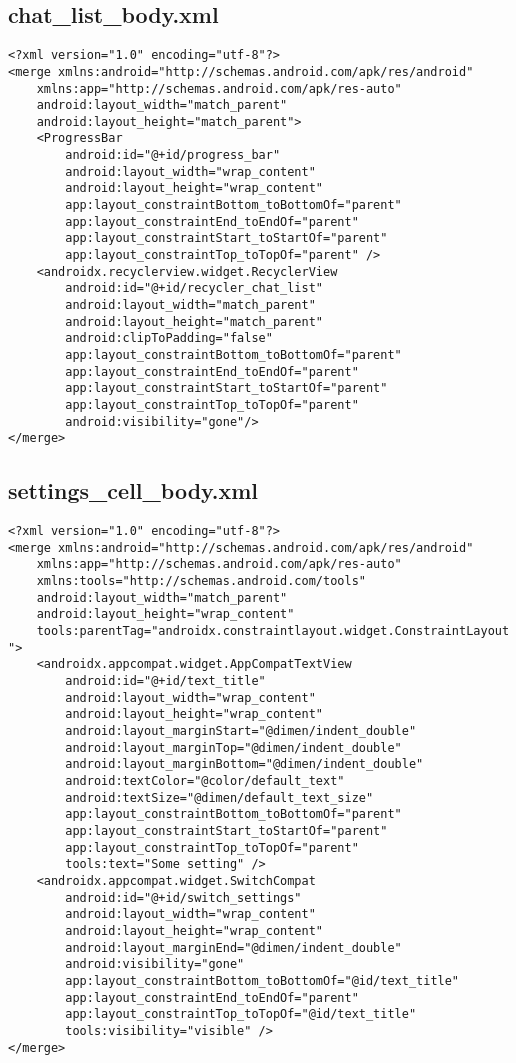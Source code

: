 \documentclass[listing]{espd}
\begin{document}
\subsection{chat\_list\_body.xml}
\begin{verbatim}
<?xml version="1.0" encoding="utf-8"?>
<merge xmlns:android="http://schemas.android.com/apk/res/android"
    xmlns:app="http://schemas.android.com/apk/res-auto"
    android:layout_width="match_parent"
    android:layout_height="match_parent">
    <ProgressBar
        android:id="@+id/progress_bar"
        android:layout_width="wrap_content"
        android:layout_height="wrap_content"
        app:layout_constraintBottom_toBottomOf="parent"
        app:layout_constraintEnd_toEndOf="parent"
        app:layout_constraintStart_toStartOf="parent"
        app:layout_constraintTop_toTopOf="parent" />
    <androidx.recyclerview.widget.RecyclerView
        android:id="@+id/recycler_chat_list"
        android:layout_width="match_parent"
        android:layout_height="match_parent"
        android:clipToPadding="false"
        app:layout_constraintBottom_toBottomOf="parent"
        app:layout_constraintEnd_toEndOf="parent"
        app:layout_constraintStart_toStartOf="parent"
        app:layout_constraintTop_toTopOf="parent"
        android:visibility="gone"/>
</merge>
\end{verbatim}

\subsection{settings\_cell\_body.xml}
\begin{verbatim}
<?xml version="1.0" encoding="utf-8"?>
<merge xmlns:android="http://schemas.android.com/apk/res/android"
    xmlns:app="http://schemas.android.com/apk/res-auto"
    xmlns:tools="http://schemas.android.com/tools"
    android:layout_width="match_parent"
    android:layout_height="wrap_content"
    tools:parentTag="androidx.constraintlayout.widget.ConstraintLayout
">
    <androidx.appcompat.widget.AppCompatTextView
        android:id="@+id/text_title"
        android:layout_width="wrap_content"
        android:layout_height="wrap_content"
        android:layout_marginStart="@dimen/indent_double"
        android:layout_marginTop="@dimen/indent_double"
        android:layout_marginBottom="@dimen/indent_double"
        android:textColor="@color/default_text"
        android:textSize="@dimen/default_text_size"
        app:layout_constraintBottom_toBottomOf="parent"
        app:layout_constraintStart_toStartOf="parent"
        app:layout_constraintTop_toTopOf="parent"
        tools:text="Some setting" />
    <androidx.appcompat.widget.SwitchCompat
        android:id="@+id/switch_settings"
        android:layout_width="wrap_content"
        android:layout_height="wrap_content"
        android:layout_marginEnd="@dimen/indent_double"
        android:visibility="gone"
        app:layout_constraintBottom_toBottomOf="@id/text_title"
        app:layout_constraintEnd_toEndOf="parent"
        app:layout_constraintTop_toTopOf="@id/text_title"
        tools:visibility="visible" />
</merge>
\end{verbatim}
\end{document}
